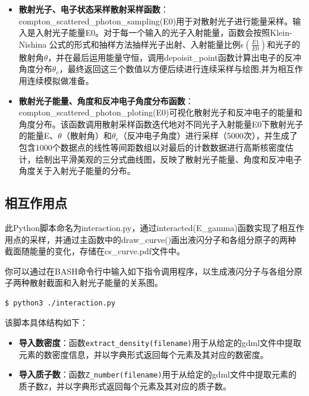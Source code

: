 \documentclass[12pt,a4paper]{article}%
\begin{document}
    \begin{tcolorbox}[width=16cm]

        \begin{itemize}

            \item \textbf{散射光子、电子状态采样散射采样函数}：compton\_scattered\_photon\_sampling(E0)用于对散射光子进行能量采样。输入是入射光子能量E0。对于每一个输入的光子入射能量，函数会按照Klein-Nishina 公式的形式和抽样方法抽样光子出射、入射能量比例$\epsilon (\frac{E1}{E0})$和光子的散射角$\theta$，并在最后运用能量守恒，调用depoisit\_point函数计算出电子的反冲角度分布$\theta_e$，最终返回这三个数值以方便后续进行连续采样与绘图,并为相互作用连续模拟做准备。
            
            \item \textbf{散射光子能量、角度和反冲电子角度分布函数}：compton\_scattered\_photon\_ploting(E0)可视化散射光子和反冲电子的能量和角度分布。该函数调用散射采样函数迭代地对不同光子入射能量E0下散射光子的能量E、$\theta$（散射角）和$\theta_e$（反冲电子角度）进行采样（5000次），并生成了包含1000个数据点的线性等间距数组以对最后的计数数据进行高斯核密度估计，绘制出平滑美观的三分式曲线图，反映了散射光子能量、角度和反冲电子角度关于入射光子能量的分布。   
            
        \end{itemize}
        
    \end{tcolorbox}
    \subsection{相互作用点}
    此Python脚本命名为interaction.py，通过interacted(E\_gamma)函数实现了相互作用点的采样，并通过主函数中的draw\_curve()画出液闪分子和各组分原子的两种截面随能量的变化，存储在cs\_curve.pdf文件中。\par
    你可以通过在BASH命令行中输入如下指令调用程序，以生成液闪分子与各组分原子两种散射截面和入射光子能量的关系图。
    \begin{lstlisting}[style=mystyle,label=code:bash]
    $ python3 ./interaction.py 
    \end{lstlisting}
    

    该脚本具体结构如下：
    \begin{tcolorbox}[width=16cm]
        \begin{itemize}
        \item \textbf{导入数密度}：函数\texttt{extract\_density(filename)}用于从给定的gdml文件中提取元素的数密度信息，并以字典形式返回每个元素及其对应的数密度。
        \item \textbf{导入质子数}：函数\texttt{Z\_number(filename)}用于从给定的gdml文件中提取元素的质子数\texttt{Z}，并以字典形式返回每个元素及其对应的质子数。
        \end{itemize}
    \end{tcolorbox}
    
\end{document}
